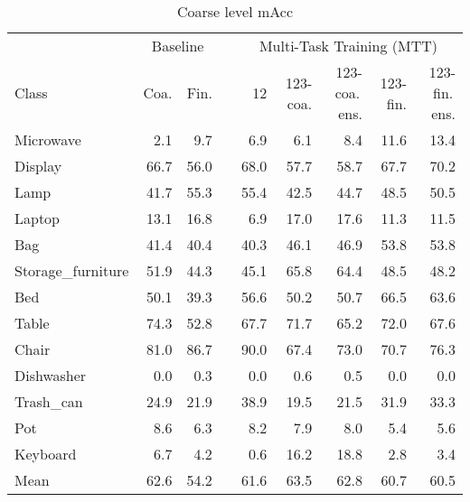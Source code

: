 \begin{table}[!h]

\caption{Coarse level mAcc}
\centering
\begin{tabular}{lrrrrrrrr}
\toprule
 &  \multicolumn{2}{c}{Baseline} && \multicolumn{5}{c}{Multi-Task Training (MTT)} \\
 \cmidrule{2-3}
 \cmidrule{5-9}
Class 			  &  	 Coa. &  				Fin. &&  	12 &  		123-coa. &  		123-coa.\,ens. &  	  123-fin. &  123-fin.\,ens. \\
\midrule
Microwave         &       2.1 &                  9.7 &&     6.9 &             6.1 &                     8.4 &          11.6 &                  13.4 \\
Display           &      66.7 &                 56.0 &&    68.0 &            57.7 &                    58.7 &          67.7 &                  70.2 \\
Lamp              &      41.7 &                 55.3 &&    55.4 &            42.5 &                    44.7 &          48.5 &                  50.5 \\
Laptop            &      13.1 &                 16.8 &&     6.9 &            17.0 &                    17.6 &          11.3 &                  11.5 \\
Bag               &      41.4 &                 40.4 &&    40.3 &            46.1 &                    46.9 &          53.8 &                  53.8 \\
Storage\_furniture &      51.9 &                 44.3 &&    45.1 &            65.8 &                    64.4 &          48.5 &                  48.2 \\
Bed               &      50.1 &                 39.3 &&    56.6 &            50.2 &                    50.7 &          66.5 &                  63.6 \\
Table             &      74.3 &                 52.8 &&    67.7 &            71.7 &                    65.2 &          72.0 &                  67.6 \\
Chair             &      81.0 &                 86.7 &&    90.0 &            67.4 &                    73.0 &          70.7 &                  76.3 \\
Dishwasher        &       0.0 &                  0.3 &&     0.0 &             0.6 &                     0.5 &           0.0 &                   0.0 \\
Trash\_can         &      24.9 &                 21.9 &&    38.9 &            19.5 &                    21.5 &          31.9 &                  33.3 \\
Pot               &       8.6 &                  6.3 &&     8.2 &             7.9 &                     8.0 &           5.4 &                   5.6 \\
Keyboard          &       6.7 &                  4.2 &&     0.6 &            16.2 &                    18.8 &           2.8 &                   3.4 \\
\midrule
Mean              &      62.6 &                 54.2 &&    61.6 &            63.5 &                    62.8 &          60.7 &                  60.5 \\
\bottomrule
\end{tabular}
\end{table}


